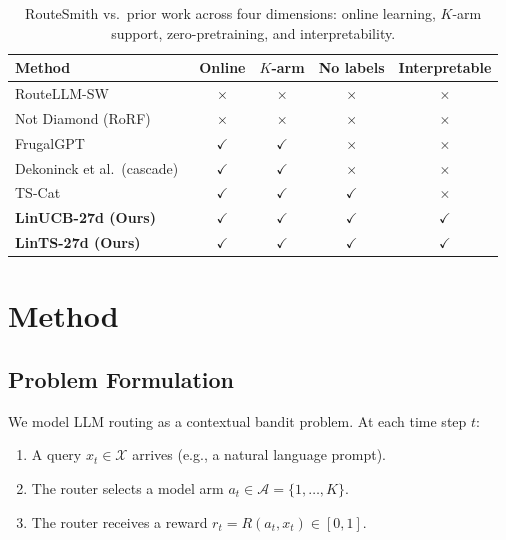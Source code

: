 \documentclass[11pt]{article}
\begin{document}
\begin{table}[h]
\centering
\caption{RouteSmith vs.\ prior work across four dimensions: online learning, $K$-arm support, zero-pretraining, and interpretability.}
\label{tab:comparison}
\begin{tabular}{@{}lcccc@{}}
\toprule
\textbf{Method} & \textbf{Online} & \textbf{$K$-arm} & \textbf{No labels} & \textbf{Interpretable} \\
\midrule
RouteLLM-SW~\cite{ong2024routellm}           & $\times$ & $\times$ & $\times$ & $\times$ \\
Not Diamond (RoRF)~\cite{notdiamond2024}     & $\times$ & $\times$ & $\times$ & $\times$ \\
FrugalGPT~\cite{chen2023frugalgpt}           & $\checkmark$ & $\checkmark$ & $\times$ & $\times$ \\
Dekoninck et al.\ (cascade)~\cite{dekoninck2025unified} & $\checkmark$ & $\checkmark$ & $\times$ & $\times$ \\
TS-Cat                                       & $\checkmark$ & $\checkmark$ & $\checkmark$ & $\times$ \\
\textbf{LinUCB-27d (Ours)}                  & $\checkmark$ & $\checkmark$ & $\checkmark$ & $\checkmark$ \\
\textbf{LinTS-27d (Ours)}                   & $\checkmark$ & $\checkmark$ & $\checkmark$ & $\checkmark$ \\
\bottomrule
\end{tabular}
\end{table}

\section{Method}
\label{sec:method}

\subsection{Problem Formulation}

We model LLM routing as a contextual bandit problem. At each time step $t$:
\begin{enumerate}
    \item A query $x_t \in \mathcal{X}$ arrives (e.g., a natural language prompt).
    \item The router selects a model arm $a_t \in \mathcal{A} = \{1, \ldots, K\}$.
    \item The router receives a reward $r_t = R(a_t, x_t) \in [0, 1]$.
\end{enumerate}
\end{document}

